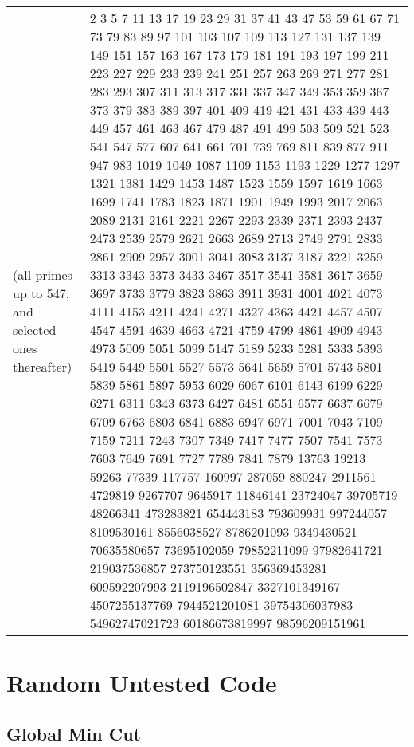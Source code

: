 \documentclass[letterpaper]{article}
\begin{document}
\begin{tabular}{@{}p{4cm}p{14cm}@{}}
(all primes up to 547, and selected ones thereafter)&2 3 5 7 11 13 17 19 23 29 31 37 41 43 47 53 59 61 67 71 73 79 83 89 97 101 103 107 109 113 127 131 137 139 149 151 157 163 167 173 179 181 191 193 197 199 211 223 227 229 233 239 241 251 257 263 269 271 277 281 283 293 307 311 313 317 331 337 347 349 353 359 367 373 379 383 389 397 401 409 419 421 431 433 439 443 449 457 461 463 467 479 487 491 499 503 509 521 523 541 547 577 607 641 661 701 739 769 811 839 877 911 947 983 1019 1049 1087 1109 1153 1193 1229 1277 1297 1321 1381 1429 1453 1487 1523 1559 1597 1619 1663 1699 1741 1783 1823 1871 1901 1949 1993 2017 2063 2089 2131 2161 2221 2267 2293 2339 2371 2393 2437 2473 2539 2579 2621 2663 2689 2713 2749 2791 2833 2861 2909 2957 3001 3041 3083 3137 3187 3221 3259 3313 3343 3373 3433 3467 3517 3541 3581 3617 3659 3697 3733 3779 3823 3863 3911 3931 4001 4021 4073 4111 4153 4211 4241 4271 4327 4363 4421 4457 4507 4547 4591 4639 4663 4721 4759 4799 4861 4909 4943 4973 5009 5051 5099 5147 5189 5233 5281 5333 5393 5419 5449 5501 5527 5573 5641 5659 5701 5743 5801 5839 5861 5897 5953 6029 6067 6101 6143 6199 6229 6271 6311 6343 6373 6427 6481 6551 6577 6637 6679 6709 6763 6803 6841 6883 6947 6971 7001 7043 7109 7159 7211 7243 7307 7349 7417 7477 7507 7541 7573 7603 7649 7691 7727 7789 7841 7879 13763 19213 59263 77339 117757 160997 287059 880247 2911561 4729819 9267707 9645917 11846141 23724047 39705719 48266341 473283821 654443183 793609931 997244057 8109530161 8556038527 8786201093 9349430521 70635580657 73695102059 79852211099 97982641721 219037536857 273750123551 356369453281 609592207993 2119196502847 3327101349167 4507255137769 7944521201081 39754306037983 54962747021723 60186673819997 98596209151961
\end{tabular}

\clearpage

\section{Random Untested Code}

\subsection{Global Min Cut}
\end{document}
